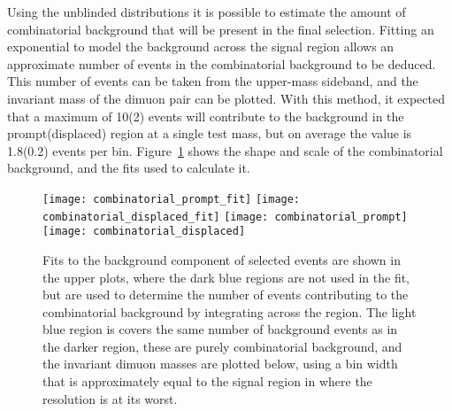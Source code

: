 Using the unblinded distributions it is possible to estimate the amount of combinatorial background
that will be present in the final selection.
Fitting an exponential to model the background across the signal region allows an approximate
number of events in the combinatorial background to be deduced.
This number of events can be taken from the upper-mass sideband, and the invariant mass of the
dimuon pair can be plotted.
With this method, it expected that a maximum of 10(2) events will contribute to the background in
the prompt(displaced) region at a single test mass, but on average the value is 1.8(0.2) events per
bin.
Figure~\ref{fig:db:comb} shows the shape and scale of the combinatorial background, and the fits
used to calculate it.

\begin{figure}
  \begin{center}
    \texttt{[image: combinatorial\_prompt\_fit]}
    \texttt{[image: combinatorial\_displaced\_fit]}
    \texttt{[image: combinatorial\_prompt]}
    \texttt{[image: combinatorial\_displaced]}
    \caption[Estimation of combinatorial background contribution]
    {
      Fits to the background component of selected \btokstrmumu events are shown in the upper
      plots, where the dark blue regions are not used in the fit, but are used to determine the
      number of events contributing to the combinatorial background by integrating across the
      region.
      The light blue region is covers the same number of background events as in the darker region,
      these are purely combinatorial background, and the invariant dimuon masses are plotted below,
      using a bin width that is approximately equal to the signal region in where the resolution is
      at its worst.
    }
    \label{fig:db:comb}
  \end{center}
\end{figure}




